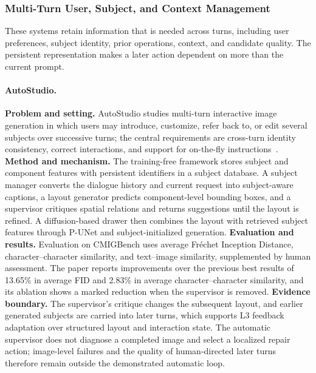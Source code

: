 \subsubsection{Multi-Turn User, Subject, and Context Management}
These systems retain information that is needed across turns, including user preferences, subject identity, prior operations, context, and candidate quality. The persistent representation makes a later action dependent on more than the current prompt.

\paragraph{AutoStudio.}
\textbf{Problem and setting.} AutoStudio studies multi-turn interactive image generation in which users may introduce, customize, refer back to, or edit several subjects over successive turns; the central requirements are cross-turn identity consistency, correct interactions, and support for on-the-fly instructions~\cite{cheng2024autostudio}. \textbf{Method and mechanism.} The training-free framework stores subject and component features with persistent identifiers in a subject database. A subject manager converts the dialogue history and current request into subject-aware captions, a layout generator predicts component-level bounding boxes, and a supervisor critiques spatial relations and returns suggestions until the layout is refined. A diffusion-based drawer then combines the layout with retrieved subject features through P-UNet and subject-initialized generation. \textbf{Evaluation and results.} Evaluation on CMIGBench uses average Fr\'echet Inception Distance, character--character similarity, and text--image similarity, supplemented by human assessment. The paper reports improvements over the previous best results of 13.65\% in average FID and 2.83\% in average character--character similarity, and its ablation shows a marked reduction when the supervisor is removed. \textbf{Evidence boundary.} The supervisor's critique changes the subsequent layout, and earlier generated subjects are carried into later turns, which supports L3 feedback adaptation over structured layout and interaction state. The automatic supervisor does not diagnose a completed image and select a localized repair action; image-level failures and the quality of human-directed later turns therefore remain outside the demonstrated automatic loop.

